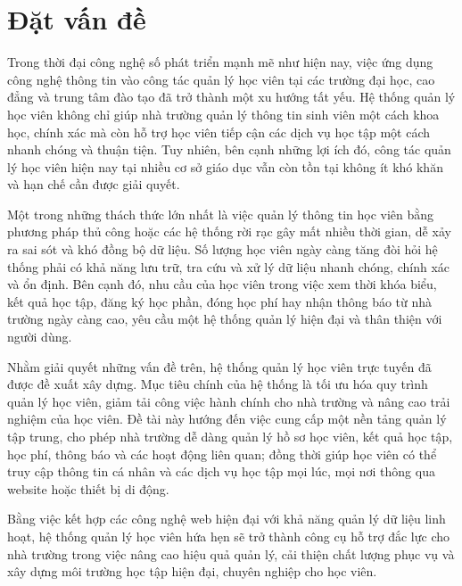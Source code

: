 \documentclass[../DoAn.tex]{subfiles}
\begin{document}
\section{Đặt vấn đề}
\label{section:1.1}
Trong thời đại công nghệ số phát triển mạnh mẽ như hiện nay, việc ứng dụng công nghệ thông tin vào công tác quản lý học viên tại các trường đại học, cao đẳng và trung tâm đào tạo đã trở thành một xu hướng tất yếu. Hệ thống quản lý học viên không chỉ giúp nhà trường quản lý thông tin sinh viên một cách khoa học, chính xác mà còn hỗ trợ học viên tiếp cận các dịch vụ học tập một cách nhanh chóng và thuận tiện. Tuy nhiên, bên cạnh những lợi ích đó, công tác quản lý học viên hiện nay tại nhiều cơ sở giáo dục vẫn còn tồn tại không ít khó khăn và hạn chế cần được giải quyết.

Một trong những thách thức lớn nhất là việc quản lý thông tin học viên bằng phương pháp thủ công hoặc các hệ thống rời rạc gây mất nhiều thời gian, dễ xảy ra sai sót và khó đồng bộ dữ liệu. Số lượng học viên ngày càng tăng đòi hỏi hệ thống phải có khả năng lưu trữ, tra cứu và xử lý dữ liệu nhanh chóng, chính xác và ổn định. Bên cạnh đó, nhu cầu của học viên trong việc xem thời khóa biểu, kết quả học tập, đăng ký học phần, đóng học phí hay nhận thông báo từ nhà trường ngày càng cao, yêu cầu một hệ thống quản lý hiện đại và thân thiện với người dùng.

Nhằm giải quyết những vấn đề trên, hệ thống quản lý học viên trực tuyến đã được đề xuất xây dựng. Mục tiêu chính của hệ thống là tối ưu hóa quy trình quản lý học viên, giảm tải công việc hành chính cho nhà trường và nâng cao trải nghiệm của học viên. Đề tài này hướng đến việc cung cấp một nền tảng quản lý tập trung, cho phép nhà trường dễ dàng quản lý hồ sơ học viên, kết quả học tập, học phí, thông báo và các hoạt động liên quan; đồng thời giúp học viên có thể truy cập thông tin cá nhân và các dịch vụ học tập mọi lúc, mọi nơi thông qua website hoặc thiết bị di động.

Bằng việc kết hợp các công nghệ web hiện đại với khả năng quản lý dữ liệu linh hoạt, hệ thống quản lý học viên hứa hẹn sẽ trở thành công cụ hỗ trợ đắc lực cho nhà trường trong việc nâng cao hiệu quả quản lý, cải thiện chất lượng phục vụ và xây dựng môi trường học tập hiện đại, chuyên nghiệp cho học viên.
\end{document}
